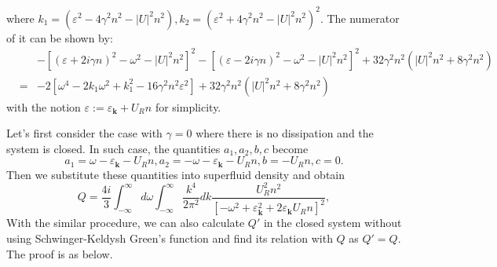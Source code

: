 \documentclass[aps,superscriptaddress,notitlepage,longbibliography]{revtex4-1}
\begin{document}
where $k_{1}=(\varepsilon^{2}-4\gamma^{2}n^{2}-|U|^{2}n^{2}),k_{2}=(\varepsilon^{2}+4\gamma^{2}n^{2}-|U|^{2}n^{2})^{2}$.
The numerator of it can be shown by: 
\begin{eqnarray}
 &  & -[(\varepsilon+2i\gamma n)^{2}-\omega^{2}-|U|^{2}n^{2}]^{2}-[(\varepsilon-2i\gamma n)^{2}-\omega^{2}-|U|^{2}n^{2}]^{2}+32\gamma^{2}n^{2}(|U|^{2}n^{2}+8\gamma^{2}n^{2})\nonumber \\
 & = & -2[\omega^{4}-2k_{1}\omega^{2}+k_{1}^{2}-16\gamma^{2}n^{2}\varepsilon^{2}]+32\gamma^{2}n^{2}(|U|^{2}n^{2}+8\gamma^{2}n^{2})
\end{eqnarray}
with the notion $\varepsilon:=\varepsilon_{\bm{k}}+U_{R}n$ for simplicity. 

Let's first consider the case with $\gamma=0$ where there is no dissipation
and the system is closed. In such case, the quantities $a_{1},a_{2},b,c$
become 
\begin{equation}
a_{1}=\omega-\varepsilon_{\bm{k}}-U_{R}n,a_{2}=-\omega-\varepsilon_{\bm{k}}-U_{R}n,b=-U_{R}n,c=0.
\end{equation}
Then we substitute these quantities into superfluid density and obtain
\begin{equation}
Q=\frac{4i}{3}\int_{-\infty}^{\infty}d\omega\int_{-\infty}^{\infty}\frac{k^{4}}{2\pi^{2}}dk\frac{U_{R}^{2}n^{2}}{[-\omega^{2}+\varepsilon_{\bm{k}}^{2}+2\varepsilon_{\bm{k}}U_{R}n]^{2}},\label{Qzero}
\end{equation}
With the similar procedure, we can also calculate $Q'$ in the closed
system without using Schwinger-Keldysh Green's function and find its
relation with $Q$ as $Q'=Q$. The proof is as below.
\end{document}
